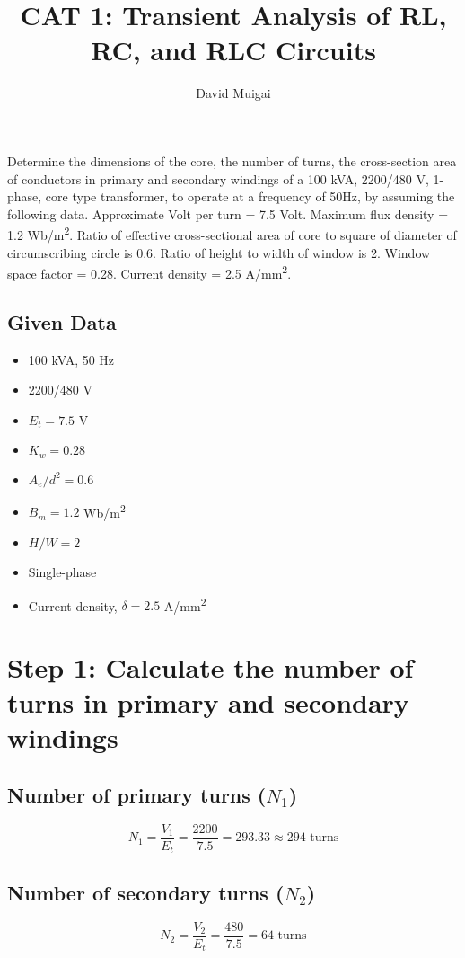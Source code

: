 \documentclass[12pt]{article}
\title{CAT 1: Transient Analysis of RL, RC, and RLC Circuits} %
\author{David Muigai} %
\begin{document}
\maketitle


Determine the dimensions of the core, the number of turns, the cross-section area of conductors in primary and secondary windings of a 100 kVA, 2200/480 V, 1-phase, core type transformer, to operate at a frequency of 50Hz, by assuming the following data. Approximate Volt per turn = 7.5 Volt. Maximum flux density = 1.2 Wb/m\textsuperscript{2}. Ratio of effective cross-sectional area of core to square of diameter of circumscribing circle is 0.6. Ratio of height to width of window is 2. Window space factor = 0.28. Current density = 2.5 A/mm\textsuperscript{2}.

\subsection*{Given Data}
\begin{itemize}
	\item 100 kVA, 50 Hz
	\item 2200/480 V
	\item $E_t = 7.5$ V
	\item $K_w = 0.28$
	\item $A_e/d^2 = 0.6$
	\item $B_m = 1.2$ Wb/m\textsuperscript{2}
	\item $H/W = 2$
	\item Single-phase
	\item Current density, $\delta = 2.5$ A/mm\textsuperscript{2}
\end{itemize}


\section*{Step 1: Calculate the number of turns in primary and secondary windings}

\subsection*{Number of primary turns ($N_1$)}
\[
N_1 = \frac{V_1}{E_t} = \frac{2200}{7.5} = 293.33 \approx 294 \text{ turns}
\]

\subsection*{Number of secondary turns ($N_2$)}
\[
N_2 = \frac{V_2}{E_t} = \frac{480}{7.5} = 64 \text{ turns}
\]
\end{document}
